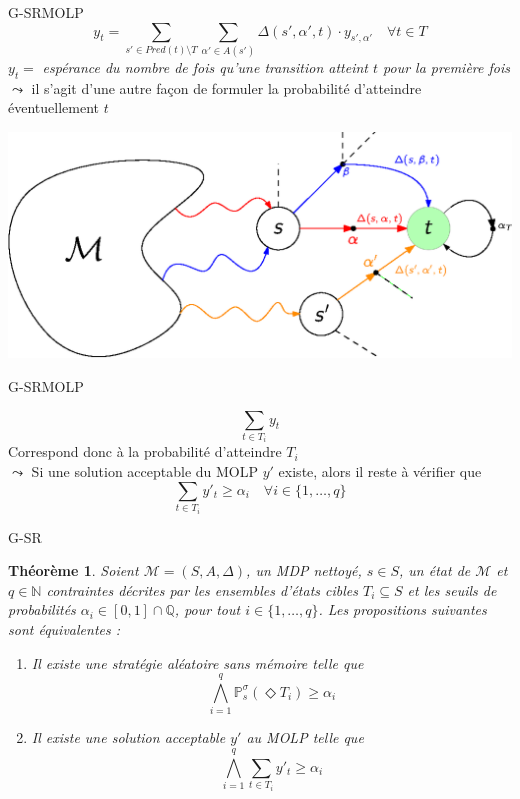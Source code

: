 \documentclass[compress]{beamer}
\theoremstyle{theorem}%
\newtheorem{theoreme}{Théorème}
\begin{document}
\begin{frame}{G-SR}{MOLP}
  \small
    \vspace{-0.05\linewidth}
    \begin{equation*}
      y_t = \sum_{s' \in Pred(t) \setminus T} \sum_{\alpha'\in A(s')} \Delta(s', \alpha', t) \cdot y_{s', \alpha'} \quad \forall t \in T
    \end{equation*}
    $y_t = $ \textit{espérance du nombre de fois qu'une transition atteint $t$ {\color{fibeamer@orange}pour la première fois}} \\
    $\leadsto$ il s'agit d'une autre façon de formuler la probabilité d'atteindre éventuellement $t$
  \begin{center}
    \includegraphics[width=0.7\linewidth]{resources/MOLP1}
  \end{center}
\end{frame}

\begin{frame}{G-SR}{MOLP}
\begin{center}
\[ \sum_{t \in T_i} y_t \]
Correspond donc à la probabilité d'atteindre $T_i$ \\
{\color{fibeamer@blue}$\leadsto$} Si une solution acceptable du MOLP $y'$ existe, alors il reste à vérifier que
\[
  \sum_{t \in T_i} y'_t \geq \alpha_i \quad \forall i \in \{1, \dots, q\}
\]
\end{center}
\end{frame}

\begin{frame}{G-SR}
  \vspace{-0.05\linewidth}
  \begin{theoreme}
    \footnotesize
    Soient $\mathcal{M} = (S, A, \Delta)$, un MDP nettoyé, $s \in S$, un état de $\mathcal{M}$ et $q \in \mathbb{N}$
    contraintes décrites par les ensembles d'états cibles $T_i \subseteq S$ et
    les seuils de probabilités $\alpha_i \in [0, 1] \cap \mathbb{Q}$, pour tout $i \in \{1, \dots, q\}$. Les propositions suivantes sont équivalentes :
    \begin{enumerate}
      \item[$(1.)$] Il existe une stratégie aléatoire sans mémoire telle que
        \[
          \bigwedge_{i=1}^q \mathbb{P}_s^\sigma (\Diamond T_i) \geq \alpha_i
        \]
      \item[$(2.)$] Il existe une solution acceptable $y'$ au MOLP telle que
        \[
          \bigwedge_{i=1}^q \sum_{t \in T_i} y'_{t} \geq \alpha_i
        \]
    \end{enumerate}
  \end{theoreme}
\end{frame}
\end{document}
